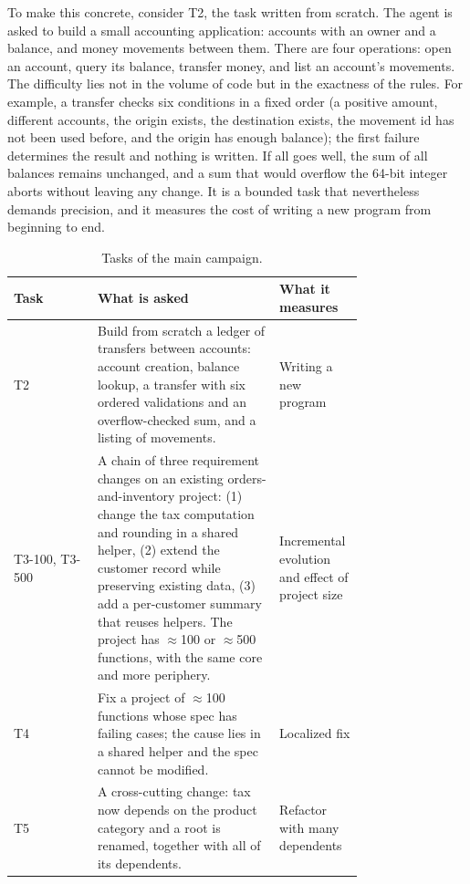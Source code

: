 \documentclass[11pt, a4paper]{article}
\begin{document}
To make this concrete, consider T2, the task written from scratch. The agent is asked to build a small accounting application: accounts with an owner and a balance, and money movements between them. There are four operations: open an account, query its balance, transfer money, and list an account's movements. The difficulty lies not in the volume of code but in the exactness of the rules. For example, a transfer checks six conditions in a fixed order (a positive amount, different accounts, the origin exists, the destination exists, the movement id has not been used before, and the origin has enough balance); the first failure determines the result and nothing is written. If all goes well, the sum of all balances remains unchanged, and a sum that would overflow the 64-bit integer aborts without leaving any change. It is a bounded task that nevertheless demands precision, and it measures the cost of writing a new program from beginning to end.

\begin{table}[h]
\centering
\small
\caption{Tasks of the main campaign.}
\label{tab:tasks}
\begin{tabular}{@{}l p{0.52\linewidth} p{0.24\linewidth}@{}}
\toprule
Task & What is asked & What it measures \\
\midrule
T2 & Build from scratch a ledger of transfers between accounts: account creation, balance lookup, a transfer with six ordered validations and an overflow-checked sum, and a listing of movements. & Writing a new program \\
T3-100, T3-500 & A chain of three requirement changes on an existing orders-and-inventory project: (1) change the tax computation and rounding in a shared helper, (2) extend the customer record while preserving existing data, (3) add a per-customer summary that reuses helpers. The project has $\approx$100 or $\approx$500 functions, with the same core and more periphery. & Incremental evolution and effect of project size \\
T4 & Fix a project of $\approx$100 functions whose spec has failing cases; the cause lies in a shared helper and the spec cannot be modified. & Localized fix \\
T5 & A cross-cutting change: tax now depends on the product category and a root is renamed, together with all of its dependents. & Refactor with many dependents \\
\bottomrule
\end{tabular}
\end{table}
\end{document}

